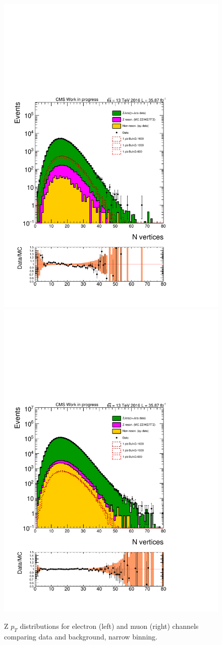 \begin{figure}[htbp!]
\centering
\includegraphics[width=0.46\linewidth,page=10]{figures/ReMiniSummer16_DT_PhReMiniMCRcFixXsec_GMCPhPtWt_tightzpt50_puWeightsummer16_muoneg_gjet_metfilter_unblind_el_log_1pb.pdf}
\includegraphics[width=0.46\linewidth,page=10]{figures/ReMiniSummer16_DT_PhReMiniMCRcFixXsec_GMCPhPtWt_tightzpt50_puWeightsummer16_muoneg_gjet_metfilter_unblind_mu_log_1pb.pdf}
\caption{Z $p_T$ distributions for electron (left) and muon (right) channels
comparing data and background,
narrow binning.}
\label{fig:gjet_zpt_narrow}
\end{figure}

